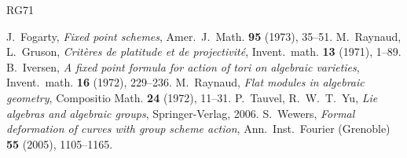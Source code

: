 \begin{thebibliography}{RG71}
\item[]
 J.~Fogarty, \textit{Fixed point schemes}, Amer.~J.~Math. \textbf{95} (1973), 35--51.
 M.~Raynaud, L.~Gruson, \textit{Critères de platitude et de projectivité}, Invent.~math. \textbf{13} (1971), 1--89.
 B.~Iversen, \textit{A fixed point formula for action of tori on algebraic varieties}, Invent.~math. \textbf{16} (1972), 229--236.
 M.~Raynaud, \textit{Flat modules in algebraic geometry}, Compositio Math. \textbf{24} (1972), 11--31.
 P.~Tauvel, R.~W.~T.~Yu, \textit{Lie algebras and algebraic groups}, Springer-Verlag, 2006.
 S.~Wewers, \textit{Formal deformation of curves with group scheme action}, Ann.~Inst.~Fourier (Grenoble) \textbf{55} (2005), 1105--1165.
\end{thebibliography}
